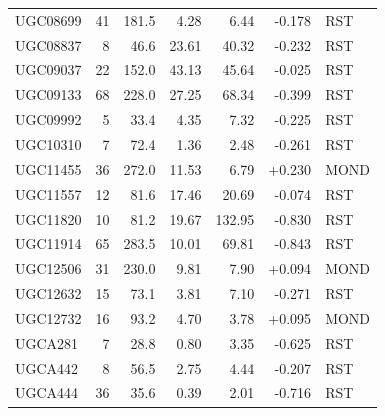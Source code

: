 \documentclass[11pt,a4paper]{article}
\begin{document}
\begin{longtable}{lrrrrrl}
UGC08699             &  41 &  181.5 &     4.28 &     6.44 & -0.178 & RST \\
UGC08837             &   8 &   46.6 &    23.61 &    40.32 & -0.232 & RST \\
UGC09037             &  22 &  152.0 &    43.13 &    45.64 & -0.025 & RST \\
UGC09133             &  68 &  228.0 &    27.25 &    68.34 & -0.399 & RST \\
UGC09992             &   5 &   33.4 &     4.35 &     7.32 & -0.225 & RST \\
UGC10310             &   7 &   72.4 &     1.36 &     2.48 & -0.261 & RST \\
UGC11455             &  36 &  272.0 &    11.53 &     6.79 & +0.230 & MOND \\
UGC11557             &  12 &   81.6 &    17.46 &    20.69 & -0.074 & RST \\
UGC11820             &  10 &   81.2 &    19.67 &   132.95 & -0.830 & RST \\
UGC11914             &  65 &  283.5 &    10.01 &    69.81 & -0.843 & RST \\
UGC12506             &  31 &  230.0 &     9.81 &     7.90 & +0.094 & MOND \\
UGC12632             &  15 &   73.1 &     3.81 &     7.10 & -0.271 & RST \\
UGC12732             &  16 &   93.2 &     4.70 &     3.78 & +0.095 & MOND \\
UGCA281              &   7 &   28.8 &     0.80 &     3.35 & -0.625 & RST \\
UGCA442              &   8 &   56.5 &     2.75 &     4.44 & -0.207 & RST \\
UGCA444              &  36 &   35.6 &     0.39 &     2.01 & -0.716 & RST \\
\end{longtable}
\end{document}

